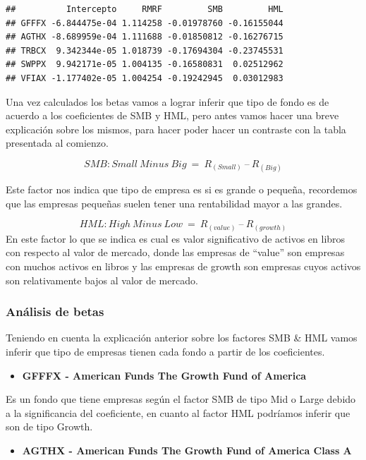\documentclass[
  12pt,
]{article}
\providecommand{\tightlist}{%
  \setlength{\itemsep}{0pt}\setlength{\parskip}{0pt}}
\begin{document}
\begin{verbatim}
##          Intercepto     RMRF         SMB         HML
## GFFFX -6.844475e-04 1.114258 -0.01978760 -0.16155044
## AGTHX -8.689959e-04 1.111688 -0.01850812 -0.16276715
## TRBCX  9.342344e-05 1.018739 -0.17694304 -0.23745531
## SWPPX  9.942171e-05 1.004135 -0.16580831  0.02512962
## VFIAX -1.177402e-05 1.004254 -0.19242945  0.03012983
\end{verbatim}

Una vez calculados los betas vamos a lograr inferir que tipo de fondo es
de acuerdo a los coeficientes de SMB y HML, pero antes vamos hacer una
breve explicación sobre los mismos, para hacer poder hacer un contraste
con la tabla presentada al comienzo.

\[
SMB:Small\ Minus\ Big\ =\ R_{\left(Small\right)}\ –\ R_{\left(Big\right)}
\]

Este factor nos indica que tipo de empresa es si es grande o pequeña,
recordemos que las empresas pequeñas suelen tener una rentabilidad mayor
a las grandes.

\[
HML:High\ Minus\ Low\ =\ R_{\left(value\right)}\ –\ R_{\left(growth\right)}
\] En este factor lo que se indica es cual es valor significativo de
activos en libros con respecto al valor de mercado, donde las empresas
de ``value'' son empresas con muchos activos en libros y las empresas de
growth son empresas cuyos activos son relativamente bajos al valor de
mercado.

\hypertarget{anuxe1lisis-de-betas}{%
\subsubsection{Análisis de betas}\label{anuxe1lisis-de-betas}}

Teniendo en cuenta la explicación anterior sobre los factores SMB \& HML
vamos inferir que tipo de empresas tienen cada fondo a partir de los
coeficientes.

\begin{itemize}
\tightlist
\item
  \textbf{GFFFX - American Funds The Growth Fund of America}
\end{itemize}

Es un fondo que tiene empresas según el factor SMB de tipo Mid o Large
debido a la significancia del coeficiente, en cuanto al factor HML
podríamos inferir que son de tipo Growth.

\begin{itemize}
\tightlist
\item
  \textbf{AGTHX - American Funds The Growth Fund of America Class A}
\end{itemize}
\end{document}
